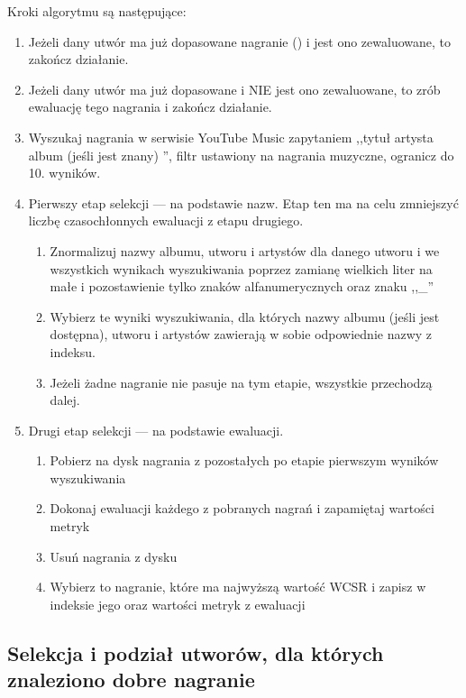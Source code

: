 Kroki algorytmu są następujące:
\begin{enumerate}
    \item Jeżeli dany utwór ma już dopasowane nagranie () i jest ono zewaluowane, to
        zakończ działanie.
    \item Jeżeli dany utwór ma już dopasowane  i NIE jest ono zewaluowane, to zrób
        ewaluację tego nagrania i zakończ działanie.
    \item Wyszukaj nagrania w serwisie YouTube Music zapytaniem ,,tytuł artysta album (jeśli jest
        znany) '', filtr ustawiony na nagrania muzyczne, ogranicz do 10. wyników.
    \item Pierwszy etap selekcji --- na podstawie nazw. Etap ten ma na celu zmniejszyć liczbę
        czasochłonnych ewaluacji z etapu drugiego. 
        \begin{enumerate}
            \item Znormalizuj nazwy albumu, utworu i artystów dla danego utworu i we wszystkich
                wynikach wyszukiwania poprzez zamianę wielkich liter na małe i pozostawienie tylko
                znaków alfanumerycznych oraz znaku ,,\_''
            \item Wybierz te wyniki wyszukiwania, dla których nazwy albumu (jeśli jest
                dostępna), utworu i artystów zawierają w sobie odpowiednie nazwy z indeksu.
            \item Jeżeli żadne nagranie nie pasuje na tym etapie, wszystkie przechodzą dalej.
        \end{enumerate}
    \item Drugi etap selekcji --- na podstawie ewaluacji.
        \begin{enumerate}
            \item Pobierz na dysk nagrania z pozostałych po etapie pierwszym wyników wyszukiwania
            \item Dokonaj ewaluacji każdego z pobranych nagrań i zapamiętaj wartości metryk
            \item Usuń nagrania z dysku
            \item Wybierz to nagranie, które ma najwyższą wartość WCSR i zapisz w indeksie jego
                 oraz wartości metryk z ewaluacji
        \end{enumerate}
\end{enumerate}

\subsection{Selekcja i podział utworów, dla których znaleziono dobre nagranie}

